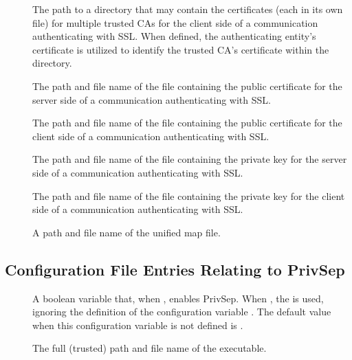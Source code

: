 \begin{description}
\item[]
\label{param:AuthSSLClientCADir} 
The path to a directory that may contain the 
certificates (each in its own file) for multiple trusted CAs 
for the client side of a communication authenticating 
with SSL.
When defined, the authenticating entity's certificate 
is utilized to identify the trusted CA's certificate
within the directory.


\item[]
\label{param:AuthSSLServerCertfile}  
The path and file name of
the file containing the public certificate
for the server side of a communication authenticating
with SSL.

\item[]
\label{param:AuthSSLClientCertfile}
The path and file name of
the file containing the public certificate
for the client side of a communication authenticating
with SSL.


\item[]
\label{param:AuthSSLServerKeyfile}
The path and file name of
the file containing the private key
for the server side of a communication authenticating
with SSL.

\item[]
\label{param:AuthSSLClientKeyfile}
The path and file name of
the file containing the private key
for the client side of a communication authenticating
with SSL.


\item[]
\label{param:CertificateMapfile}
A path and file name of the unified map file.

\end{description}

\subsection{\label{sec:Config-PrivSep}Configuration File Entries
Relating to PrivSep}
\begin{description}
\item[]
  \label{param:PrivSepEnabled}
  A boolean variable that, when , enables PrivSep.
  When , the  is used,
  ignoring the definition of the configuration variable .
  The default value when this configuration variable is not defined
  is .

\item[]
  \label{param:PrivSepSwitchboard}
  The full (trusted) path and file name of the 
  executable.
\end{description}

